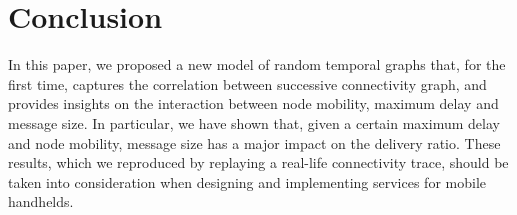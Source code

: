 \documentclass{sig-alt-release2}
\begin{document}
\section{Conclusion}
In this paper, we proposed a new model of random temporal graphs that,
for the first time, captures the correlation between successive
connectivity graph, and provides insights on the interaction between
node mobility, maximum delay and message size. In particular, we have
shown that, given a certain maximum delay and node mobility, message
size has a major impact on the delivery ratio. These results, which we
reproduced by replaying a real-life connectivity
trace, should be taken into consideration
when designing and implementing services for mobile handhelds.


\small

\end{document}
